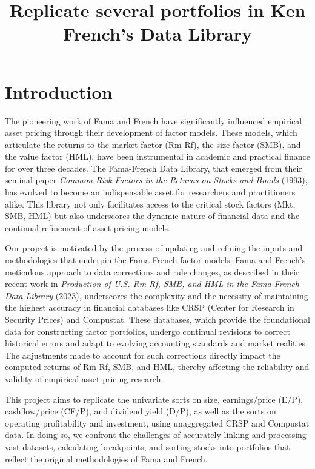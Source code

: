 \documentclass{article}
\title{Replicate several portfolios in Ken French’s Data Library}
\author{}
\date{}
\begin{document}
\maketitle

\section*{Introduction}

The pioneering work of Fama and French have significantly influenced empirical asset pricing through their development of factor models. These models, which articulate the returns to the market factor (Rm-Rf), the size factor (SMB), and the value factor (HML), have been instrumental in academic and practical finance for over three decades. The Fama-French Data Library, that emerged from their seminal paper \textit{Common Risk Factors in the Returns on Stocks and Bonds} (1993), has evolved to become an indispensable asset for researchers and practitioners alike. This library not only facilitates access to the critical stock factors (Mkt, SMB, HML) but also underscores the dynamic nature of financial data and the continual refinement of asset pricing models.

Our project is motivated by the process of updating and refining the inputs and methodologies that underpin the Fama-French factor models. Fama and French's meticulous approach to data corrections and rule changes, as described in their recent work in \textit{Production of U.S. Rm-Rf, SMB, and HML in the Fama-French Data Library} (2023), underscores the complexity and the necessity of maintaining the highest accuracy in financial databases like CRSP (Center for Research in Security Prices) and Compustat. These databases, which provide the foundational data for constructing factor portfolios, undergo continual revisions to correct historical errors and adapt to evolving accounting standards and market realities. The adjustments made to account for such corrections directly impact the computed returns of Rm-Rf, SMB, and HML, thereby affecting the reliability and validity of empirical asset pricing research.

This project aims to replicate the univariate sorts on size, earnings/price (E/P), cashflow/price (CF/P), and dividend yield (D/P), as well as the sorts on operating profitability and investment, using unaggregated CRSP and Compustat data. In doing so, we confront the challenges of accurately linking and processing vast datasets, calculating breakpoints, and sorting stocks into portfolios that reflect the original methodologies of Fama and French. 
\end{document}
